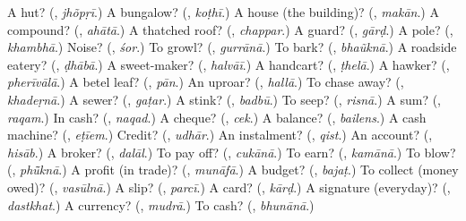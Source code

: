 \begin{tcolorbox}[breakable,colback=teal!4,colframe=teal!35!black,title={Before you move on}]
A hut? (\textbf{}, \emph{jhõpṛī}.) A bungalow? (\textbf{}, \emph{koṭhī}.) A house (the building)? (\textbf{}, \emph{makān}.) A compound? (\textbf{}, \emph{ahātā}.) A thatched roof? (\textbf{}, \emph{chappar}.) A guard? (\textbf{}, \emph{gārḍ}.) A pole? (\textbf{}, \emph{khambhā}.) Noise? (\textbf{}, \emph{śor}.) To growl? (\textbf{}, \emph{gurrānā}.) To bark? (\textbf{}, \emph{bhaũknā}.) A roadside eatery? (\textbf{}, \emph{ḍhābā}.) A sweet-maker? (\textbf{}, \emph{halvāī}.) A handcart? (\textbf{}, \emph{ṭhelā}.) A hawker? (\textbf{}, \emph{pherīvālā}.) A betel leaf? (\textbf{}, \emph{pān}.) An uproar? (\textbf{}, \emph{hallā}.) To chase away? (\textbf{}, \emph{khadeṛnā}.) A sewer? (\textbf{}, \emph{gaṭar}.) A stink? (\textbf{}, \emph{badbū}.) To seep? (\textbf{}, \emph{risnā}.) A sum? (\textbf{}, \emph{raqam}.) In cash? (\textbf{}, \emph{naqad}.) A cheque? (\textbf{}, \emph{cek}.) A balance? (\textbf{}, \emph{bailens}.) A cash machine? (\textbf{}, \emph{eṭīem}.) Credit? (\textbf{}, \emph{udhār}.) An instalment? (\textbf{}, \emph{qist}.) An account? (\textbf{}, \emph{hisāb}.) A broker? (\textbf{}, \emph{dalāl}.) To pay off? (\textbf{}, \emph{cukānā}.) To earn? (\textbf{}, \emph{kamānā}.) To blow? (\textbf{}, \emph{phū̃knā}.) A profit (in trade)? (\textbf{}, \emph{munāfā}.) A budget? (\textbf{}, \emph{bajaṭ}.) To collect (money owed)? (\textbf{}, \emph{vasūlnā}.) A slip? (\textbf{}, \emph{parcī}.) A card? (\textbf{}, \emph{kārḍ}.) A signature (everyday)? (\textbf{}, \emph{dastkhat}.) A currency? (\textbf{}, \emph{mudrā}.) To cash? (\textbf{}, \emph{bhunānā}.)
\end{tcolorbox}
